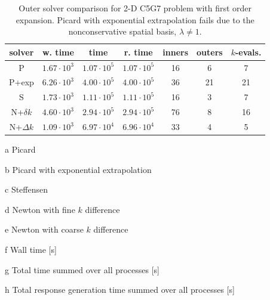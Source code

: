 \begin{table}[ht] 
 \begin{center} 
 
  \begin{threeparttable}
 \begin{tabular}{ccccccc} 
 \toprule 
  solver & w. time\tnote{f} & time\tnote{g} & r. time\tnote{h} & inners & outers & $k$-evals. \\
  \midrule
    P\tnote{a}            &  $1.67\cdot 10^3$ &  $1.07\cdot 10^5$ &  $1.07\cdot 10^5$ &           16 &            6 &            7 \\ 
    P+exp\tnote{b}        &  $6.26\cdot 10^3$ &  $4.00\cdot 10^5$ &  $4.00\cdot 10^5$ &           36 &           21 &           21 \\ 
    S\tnote{c}            &  $1.73\cdot 10^3$ &  $1.11\cdot 10^5$ &  $1.11\cdot 10^5$ &           16 &            3 &            7 \\ 
    N+$\delta k$\tnote{d}            &  $4.60\cdot 10^3$ &  $2.94\cdot 10^5$ &  $2.94\cdot 10^5$ &           76 &            8 &           16 \\ 
    N+$\Delta k$\tnote{e} &  $1.09\cdot 10^3$ &  $6.97\cdot 10^4$ &  $6.96\cdot 10^4$ &           33 &            4 &            5 \\ 
 \bottomrule 
 \end{tabular} 
 
 {\footnotesize
 \begin{tablenotes}
   \item[a] Picard 
   \item[b] Picard with exponential extrapolation
   \item[c] Steffensen
   \item[d] Newton with fine $k$ difference
   \item[e] Newton with coarse $k$ difference
   \item[f] Wall time [s]
   \item[g] Total time summed over all processes [s]
   \item[h] Total response generation time summed over all processes [s]
 \end{tablenotes}
 }
 
 \end{threeparttable}
 
 \end{center} 
 \caption{Outer solver comparison for 2-D C5G7 problem with first order expansion.
          Picard with exponential extrapolation fails due to the nonconservative spatial 
          basis, \ie $\lambda \ne 1$.} 
 \label{tbl:c5g7_outer_study} 
\end{table} 

